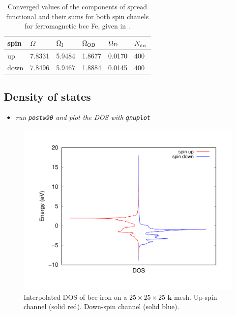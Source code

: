 \begin{table}[t!]
	\centering
	\captionsetup{width=.5\textwidth}
	\caption{Converged values of the components of spread functional and their sums for both spin chanels for ferromagnetic bcc Fe, given in \angsqd{}.}
	\begin{tabular}{@{} llllll @{}}\toprule[1.5pt]
	spin & $\Omega$ & $\Omega\tinysub{I}$ & $\Omega\tinysub{OD}$ & $\Omega\tinysub{D}$ & $N_{\mathrm{iter}}$ \\\midrule
	up & 7.8331 & 5.9484 & 1.8677 & 0.0170 & 400 \\
	down & 7.8496 & 5.9467 & 1.8884 & 0.0145 & 400 \\\bottomrule[1pt]
	\end{tabular}\label{tab8.1}
\end{table} 
	

\subsection*{Density of states}
\begin{itemize}
	\item {\it run {\tt postw90} and plot the DOS with {\tt gnuplot}}
\end{itemize}
	\begin{figure}[h!]
	\centering
	\includegraphics[width=0.7\columnwidth]{figure/example08/DOS_iron_bcc.pdf}
	\caption{Interpolated DOS of bcc iron on a $25\times25\times25$ $\mathbf{k}$-mesh. Up-spin channel (solid red). Down-spin channel (solid blue).}\label{fig8.1}
	\end{figure}

